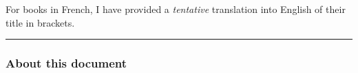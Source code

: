 \documentclass[11pt,a4paper,svgnames]{article}
\begin{document}
\clearpage


\medskip


\printindex

\medskip

\clearpage
{}


\medskip



\begin{flushright}
  \begin{relsize}{-2}
    For books in French, I have provided a \emph{tentative} translation into
    English of their title in brackets.
  \end{relsize}
\end{flushright}

\medskip

\bigskip

\hrule

\bigskip

\subsubsection*{About this document}
\end{document}
